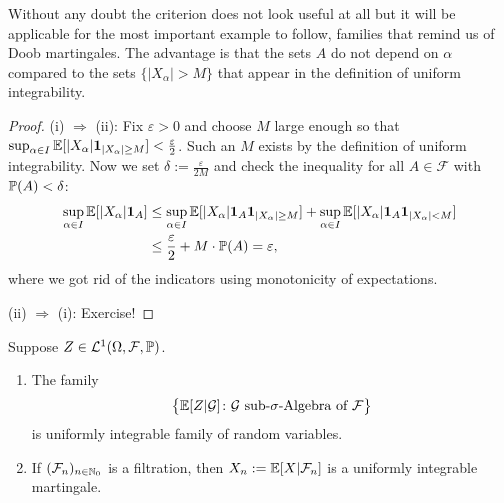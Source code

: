 Without any doubt the criterion does not look useful at all but it will be applicable for the most important example to follow, families that remind us of Doob martingales. The advantage is that the sets $A$ do not depend on $\alpha$ compared to the sets $\{|X_\alpha|>M\}$ that appear in the definition of uniform integrability.
\begin{proof}[Proof]
	(i) $\Rightarrow$ (ii): Fix $\varepsilon>0$ and choose $M$ large enough so that $\sup_{\alpha\in I} \E[\lvert X_{\alpha}\rvert \mathbf 1_{\lvert X_{\alpha} \rvert \geq M}] < \frac{\varepsilon}{2}$. Such an $M$ exists by the definition of uniform integrability. Now we set $\delta:= \frac{\varepsilon}{2M}$ and check the inequality for all $A\in \mathcal F$ with $\P(A)<\delta$:
	\begin{align*}
		\sup\limits_{\alpha\in I} \E[\lvert X_{\alpha}\rvert \mathbf 1_A] &\leq \sup\limits_{\alpha\in I} \E[\lvert X_{\alpha}\rvert \mathbf 1_A \mathbf 1_{\lvert X_{\alpha}\rvert \geq M}] + \sup\limits_{\alpha\in I} \E[\lvert X_{\alpha}\rvert \mathbf 1_A \mathbf 1_{\lvert X_{\alpha}\rvert < M}] \\	
		&\leq \frac{\varepsilon}{2} + M \cdot \mathbb{P}(A)=\varepsilon,
	\end{align*}
	where we got rid of the indicators using monotonicity of expectations.\smallskip
	
	(ii) $\Rightarrow$ (i): Exercise! 
\end{proof}
\begin{llemma}
\begin{lemma}\label{lemma_345}
	Suppose $Z \in \cL^1(\Omega,\cF,\mathbb{P})$.
	\begin{enumerate}[label=(\roman*)]
	\item The family
	\begin{align*}
		\big\{ \E[Z|\mathcal G]\colon \mathcal G \text{  sub-}\sigma\text{-Algebra of }\cF\big\}
	\end{align*}
	 is uniformly integrable family of random variables.
	 \item If $(\mathcal F_n)_{n\in \N_0}$ is a filtration, then $X_n:=\E[X|\mathcal F_n]$ is a uniformly integrable martingale.
	\end{enumerate}
\end{lemma}
\end{llemma}
